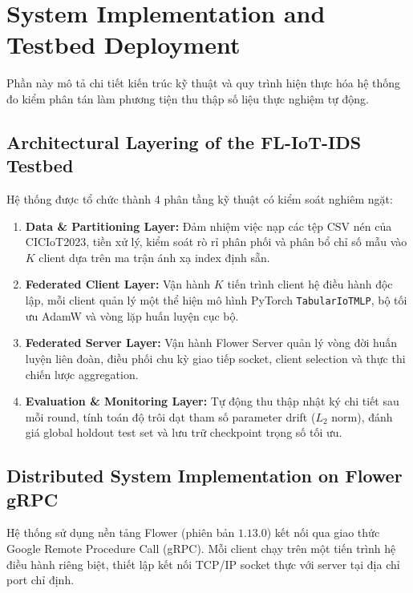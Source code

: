 \section{System Implementation and Testbed Deployment}
\label{sec:impl_deployment}
Phần này mô tả chi tiết kiến trúc kỹ thuật và quy trình hiện thực hóa hệ thống đo kiểm phân tán làm phương tiện thu thập số liệu thực nghiệm tự động.

\subsection{Architectural Layering of the FL-IoT-IDS Testbed}
Hệ thống được tổ chức thành 4 phân tầng kỹ thuật có kiểm soát nghiêm ngặt:
\begin{enumerate}
    \item \textbf{Data \& Partitioning Layer:} Đảm nhiệm việc nạp các tệp CSV nén của CICIoT2023, tiền xử lý, kiểm soát rò rỉ phân phối và phân bổ chỉ số mẫu vào $K$ client dựa trên ma trận ánh xạ index định sẵn.
    \item \textbf{Federated Client Layer:} Vận hành $K$ tiến trình client hệ điều hành độc lập, mỗi client quản lý một thể hiện mô hình PyTorch \texttt{TabularIoTMLP}, bộ tối ưu AdamW và vòng lặp huấn luyện cục bộ.
    \item \textbf{Federated Server Layer:} Vận hành Flower Server quản lý vòng đời huấn luyện liên đoàn, điều phối chu kỳ giao tiếp socket, client selection và thực thi chiến lược aggregation.
    \item \textbf{Evaluation \& Monitoring Layer:} Tự động thu thập nhật ký chi tiết sau mỗi round, tính toán độ trôi dạt tham số parameter drift ($L_2$ norm), đánh giá global holdout test set và lưu trữ checkpoint trọng số tối ưu.
\end{enumerate}

\subsection{Distributed System Implementation on Flower gRPC}
Hệ thống sử dụng nền tảng Flower (phiên bản $1.13.0$) kết nối qua giao thức Google Remote Procedure Call (gRPC). Mỗi client chạy trên một tiến trình hệ điều hành riêng biệt, thiết lập kết nối TCP/IP socket thực với server tại địa chỉ port chỉ định.

